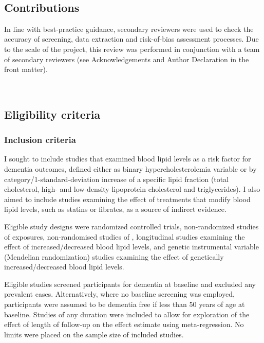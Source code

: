 \documentclass[a4paper, twoside]{templates/ociamthesis}
\begin{document}
~

\hypertarget{contributions}{%
\subsection{Contributions}\label{contributions}}

In line with best-practice guidance, secondary reviewers were used to check the accuracy of screening, data extraction and risk-of-bias assessment processes. Due to the scale of the project, this review was performed in conjunction with a team of secondary reviewers (see Acknowledgements and Author Declaration in the front matter).

~

\hypertarget{eligibility-criteria}{%
\subsection{Eligibility criteria}\label{eligibility-criteria}}

\hypertarget{inclusion-criteria}{%
\subsubsection{Inclusion criteria}\label{inclusion-criteria}}

I sought to include studies that examined blood lipid levels as a risk factor for dementia outcomes, defined either as binary hypercholesterolemia variable or by category/1-standard-deviation increase of a specific lipid fraction (total cholesterol, high- and low-density lipoprotein cholesterol and triglycerides). I also aimed to include studies examining the effect of treatments that modify blood lipid levels, such as statins or fibrates, as a source of indirect evidence.

Eligible study designs were randomized controlled trials, non-randomized studies of exposures, non-randomised studies of , longitudinal studies examining the effect of increased/decreased blood lipid levels, and genetic instrumental variable (Mendelian randomization) studies examining the effect of genetically increased/decreased blood lipid levels.

Eligible studies screened participants for dementia at baseline and excluded any prevalent cases. Alternatively, where no baseline screening was employed, participants were assumed to be dementia free if less than 50 years of age at baseline. Studies of any duration were included to allow for exploration of the effect of length of follow-up on the effect estimate using meta-regression. No limits were placed on the sample size of included studies.
\end{document}
